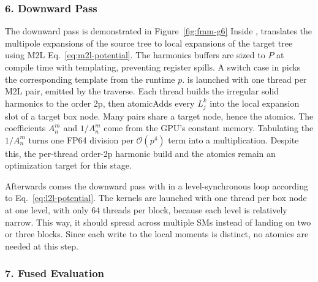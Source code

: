 

\subsubsection{6. Downward Pass}

The downward pass is demonstrated in Figure~\ref{fig:fmm-g6}
Inside ,  translates the multipole expansions of the source tree to local expansions of the target tree using M2L Eq.~\eqref{eq:m2l-potential}.
The harmonics buffers are sized to $P$ at compile time with templating, preventing register spills.
A switch case in  picks the corresponding template from the runtime $p$.
 is launched with one thread per M2L pair, emitted by the traverse.
Each thread builds the irregular solid harmonics to the order 2p, then atomicAdds every $L_j^k$ into the local expansion slot of a target box node.
Many pairs share a target node, hence the atomics.
The coefficients $A_n^m$ and $1/A_n^m$ come from the GPU's constant memory. Tabulating the $1/A_n^m$ turns one FP64 division per \(\mathcal{O}(p^{4})\) term into a multiplication.
Despite this, the per-thread order-2p harmonic build and the atomics remain an optimization target for this stage.

Afterwards comes the downward pass with  in a level-synchronous loop according to Eq.~\eqref{eq:l2l-potential}.
The kernels are launched with one thread per box node at one level, with only 64 threads per block, because each level is relatively narrow.
This way, it should spread across multiple SMs instead of landing on two or three blocks.
Since each write to the local moments is distinct, no atomics are needed at this step.



\subsubsection{7. Fused Evaluation}

